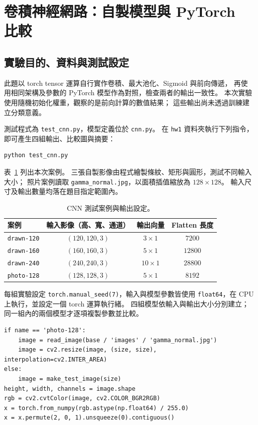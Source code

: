 \clearpage
\section{卷積神經網路：自製模型與 PyTorch 比較}
\label{sec:cnn}

\subsection{實驗目的、資料與測試設定}

此題以 torch tensor 運算自行實作卷積、最大池化、Sigmoid 與前向傳遞，
再使用相同架構及參數的 PyTorch 模型作為對照，檢查兩者的輸出一致性。
本次實驗使用隨機初始化權重，觀察的是前向計算的數值結果；
這些輸出尚未透過訓練建立分類意義。

測試程式為 \texttt{test\_cnn.py}，模型定義位於 \texttt{cnn.py}。
在 \texttt{hw1} 資料夾執行下列指令，即可產生四組輸出、比較圖與摘要：

\begin{lstlisting}[language={},caption={CNN 比較實驗的執行指令}]
python test_cnn.py
\end{lstlisting}

表~\ref{tab:cnn-cases} 列出本次案例。
三張自製影像由程式繪製條紋、矩形與圓形，測試不同輸入大小；
照片案例讀取 \texttt{gamma\_normal.jpg}，以面積插值縮放為 $128\times128$。
輸入尺寸及輸出數量均落在題目指定範圍內。

\begin{table}[H]
  \centering
  \caption{CNN 測試案例與輸出設定。}
  \label{tab:cnn-cases}
  \begin{tabular}{@{}lccc@{}}
    \toprule
    案例 & 輸入影像（高、寬、通道） & 輸出向量 & Flatten 長度 \\
    \midrule
    \texttt{drawn-120} & $(120,120,3)$ & $3\times1$ & $7200$ \\
    \texttt{drawn-160} & $(160,160,3)$ & $5\times1$ & $12800$ \\
    \texttt{drawn-240} & $(240,240,3)$ & $10\times1$ & $28800$ \\
    \texttt{photo-128} & $(128,128,3)$ & $5\times1$ & $8192$ \\
    \bottomrule
  \end{tabular}
\end{table}

每組實驗設定 \texttt{torch.manual\_seed(7)}，輸入與模型參數皆使用
\texttt{float64}，在 CPU 上執行，並設定一個 torch 運算執行緒。
四組模型依輸入與輸出大小分別建立；同一組內的兩個模型才逐項複製參數並比較。

\begin{lstlisting}[caption={讀取或建立測試圖片，轉為模型輸入},label={lst:cnn-input}]
if name == 'photo-128':
    image = read_image(base / 'images' / 'gamma_normal.jpg')
    image = cv2.resize(image, (size, size), interpolation=cv2.INTER_AREA)
else:
    image = make_test_image(size)
height, width, channels = image.shape
rgb = cv2.cvtColor(image, cv2.COLOR_BGR2RGB)
x = torch.from_numpy(rgb.astype(np.float64) / 255.0)
x = x.permute(2, 0, 1).unsqueeze(0).contiguous()
\end{lstlisting}

